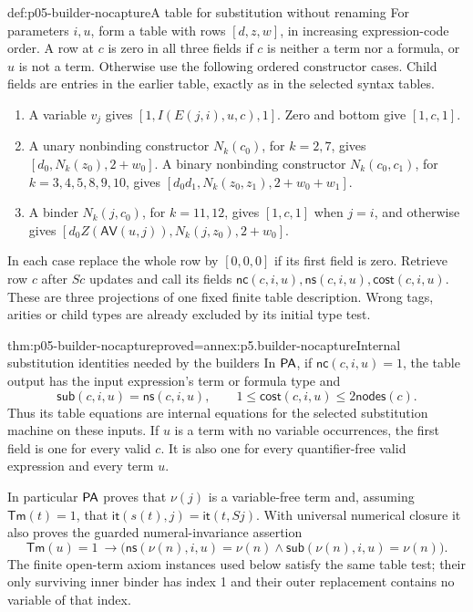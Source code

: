 \begin{hbdefinition}{def:p05-builder-nocapture}{A table for substitution without renaming}
For parameters \(i,u\), form a table with rows \([d,z,w]\), in increasing
expression-code order. A row at \(c\) is zero in all three fields if \(c\)
is neither a term nor a formula, or \(u\) is not a term. Otherwise use the
following ordered constructor cases. Child fields are entries in the earlier
table, exactly as in the selected syntax tables.
\begin{enumerate}
\item A variable \(v_j\) gives \([1,I(E(j,i),u,c),1]\).
Zero and bottom give \([1,c,1]\).
\item A unary nonbinding constructor \(N_k(c_0)\), for \(k=2,7\),
gives \([d_0,N_k(z_0),2+w_0]\). A binary nonbinding constructor
\(N_k(c_0,c_1)\), for \(k=3,4,5,8,9,10\), gives
\([d_0d_1,N_k(z_0,z_1),2+w_0+w_1]\).
\item A binder \(N_k(j,c_0)\), for \(k=11,12\), gives
\([1,c,1]\) when \(j=i\), and otherwise gives
\([d_0Z(\mathsf{AV}(u,j)),N_k(j,z_0),2+w_0]\).
\end{enumerate}
In each case replace the whole row by \([0,0,0]\) if its first field is
zero. Retrieve row \(c\) after \(Sc\) updates and call its fields
\(\mathsf{nc}(c,i,u),\mathsf{ns}(c,i,u),\mathsf{cost}(c,i,u)\).
These are three projections of one fixed finite table description. Wrong
tags, arities or child types are already excluded by its initial type test.
\end{hbdefinition}

\begin{hblemma}{thm:p05-builder-nocapture}{proved=annex:p5.builder-nocapture}{Internal substitution identities needed by the builders}
In \(\mathsf{PA}\), if \(\mathsf{nc}(c,i,u)=1\), the table output has the
input expression's term or formula type and
\[
 \mathsf{sub}(c,i,u)=\mathsf{ns}(c,i,u),\qquad
 1\leq\mathsf{cost}(c,i,u)\leq2\mathsf{nodes}(c).
\]
Thus its table equations are internal equations for the selected substitution
machine on these inputs. If \(u\) is a term with no variable occurrences,
the first field is one for every valid \(c\). It is also one for every
quantifier-free valid expression and every term \(u\).

In particular \(\mathsf{PA}\) proves that \(\nu(j)\) is a variable-free term
and, assuming \(\mathsf{Tm}(t)=1\), that
\(\mathsf{it}(s(t),j)=\mathsf{it}(t,Sj)\). With universal numerical
closure it also proves the guarded numeral-invariance assertion
\[
 \mathsf{Tm}(u)=1\ \longrightarrow
 \bigl(\mathsf{ns}(\nu(n),i,u)=\nu(n)\land
        \mathsf{sub}(\nu(n),i,u)=\nu(n)\bigr).
\]
The finite open-term axiom instances used below satisfy the same
table test; their only surviving inner binder has index 1 and their outer
replacement contains no variable of that index.
\end{hblemma}

